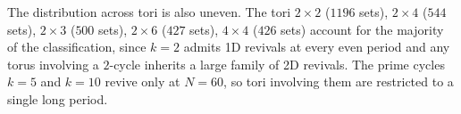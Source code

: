 \par
The distribution across tori is also uneven. The tori $2\times2$ ($1196$ sets), $2\times4$ ($544$ sets), $2\times3$ ($500$ sets), $2\times6$ ($427$ sets), $4\times4$ ($426$ sets)
account for the majority of the classification, since $k = 2$
admits 1D revivals at every even period and any torus involving a
$2$-cycle inherits a large family of 2D revivals. The prime cycles
$k = 5$ and $k = 10$ revive only at $N = 60$, so tori involving
them are restricted to a single long period.
